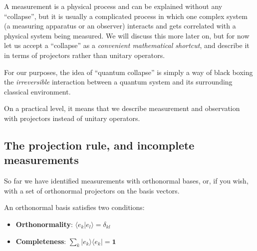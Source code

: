 \documentclass[fleqn]{article}
\providecommand{\tightlist}{%
  \setlength{\itemsep}{0pt}\setlength{\parskip}{0pt}}
\newenvironment{idea}{\noindent}{\medskip}
\begin{document}
A measurement is a physical process and can be explained without any ``collapse'', but it is usually a complicated process in which one complex system (a measuring apparatus or an observer) interacts and gets correlated with a physical system being measured.
We will discuss this more later on, but for now let us accept a ``collapse'' as a \emph{convenient mathematical shortcut}, and describe it in terms of projectors rather than unitary operators.

\begin{idea}
For our purposes, the idea of ``quantum collapse'' is simply a way of black boxing the \emph{irreversible} interaction between a quantum system and its surrounding classical environment.

On a practical level, it means that we describe measurement and observation with projectors instead of unitary operators.

\end{idea}

\hypertarget{projection-rule-and-incomplete-measurements}{%
\subsection{The projection rule, and incomplete measurements}\label{projection-rule-and-incomplete-measurements}}

So far we have identified measurements with orthonormal bases, or, if you wish, with a set of orthonormal projectors on the basis vectors.

\begin{idea}

An orthonormal basis satisfies two conditions:

\begin{itemize}
\tightlist
\item
  \textbf{Orthonormality}: \(\langle e_k|e_l\rangle = \delta_{kl}\)
\item
  \textbf{Completeness}: \(\sum_k|e_k\rangle\langle e_k| = \mathbf{1}\)
\end{itemize}

\end{idea}
\end{document}
